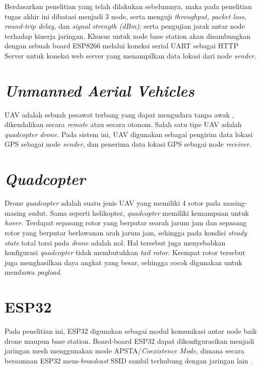Berdasarkan penelitian yang telah dilakukan sebelumnya, maka pada penelitian tugas akhir ini dibatasi menjadi 3 node, serta menguji \textit{throughput, packet loss, round-trip delay,} dan \textit{signal strength (dBm)}; serta pengujian jarak antar node terhadap kinerja jaringan. Khusus untuk node base station akan disambungkan dengan sebuah board ESP8266 melalui koneksi serial UART sebagai HTTP Server untuk koneksi web server yang menampilkan data lokasi dari node \textit{sender}.

\section{\textit{Unmanned Aerial Vehicles}}
UAV adalah sebuah pesawat terbang yang dapat mengudara tanpa awak \cite{lakshminarayananJointNetworkDisaster2015}, dikendalikan secara \textit{remote} atau secara otonom. Salah satu tipe UAV adalah \textit{quadcopter drone}. Pada sistem ini, UAV digunakan sebagai pengirim data lokasi GPS sebagai node \textit{sender}, dan penerima data lokasi GPS sebagai node \textit{receiver}.

\section{\textit{Quadcopter}}
Drone \textit{quadcopter} adalah suatu jenis UAV yang memiliki 4 rotor pada masing-masing sudut. Sama seperti helikopter, \textit{quadcopter} memiliki kemampuan untuk \textit{hover}. Terdapat sepasang rotor yang berputar searah jarum jam dan sepasang rotor yang berputar berlawanan arah jarum jam, sehingga pada kondisi \textit{steady state} total torsi pada \textit{drone} adalah nol. Hal tersebut juga menyebabkan konfigurasi \textit{quadcopter} tidak membutuhkan \textit{tail rotor}. Keempat rotor tersebut juga menghasilkan daya angkat yang besar, sehingga cocok digunakan untuk membawa \textit{payload}.

\section{ESP32}
Pada penelitian ini, ESP32 digunakan sebagai modul komunikasi antar node baik drone maupun base station. Board-board ESP32 dapat dikonfigurasikan menjadi jaringan mesh menggunakan mode APSTA/\textit{Coexistence Mode}, dimana secara bersamaan ESP32 mem-\textit{broadcast} SSID sambil terhubung dengan jaringan lain \cite{WiFiDriverESP32}. 

